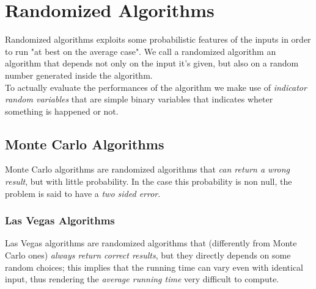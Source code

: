 \documentclass{article}
\begin{document}
	\section{Randomized Algorithms}
		Randomized algorithms exploits some probabilistic features of the inputs in order to run "at best on the average case". We call a randomized algorithm an algorithm that depends not only on the input it's given, but also on a random number generated inside the algorithm.\\
		To actually evaluate the performances of the algorithm we make use of \textit{indicator random variables} that are simple binary variables that indicates wheter something is happened or not.

		\subsection{Monte Carlo Algorithms}
			Monte Carlo algorithms are randomized algorithms that \textit{can return a wrong result}, but with little probability. In the case this probability is non null, the problem is said to have a \textit{two sided error}.
	
			\subsubsection{Las Vegas Algorithms}
				Las Vegas algorithms are randomized algorithms that (differently from Monte Carlo ones) \textit{always return correct results}, but they directly depends on some random  choices; this implies that the running time can vary even with identical input, thus rendering the \textit{average running time} very difficult to compute.
\end{document}
